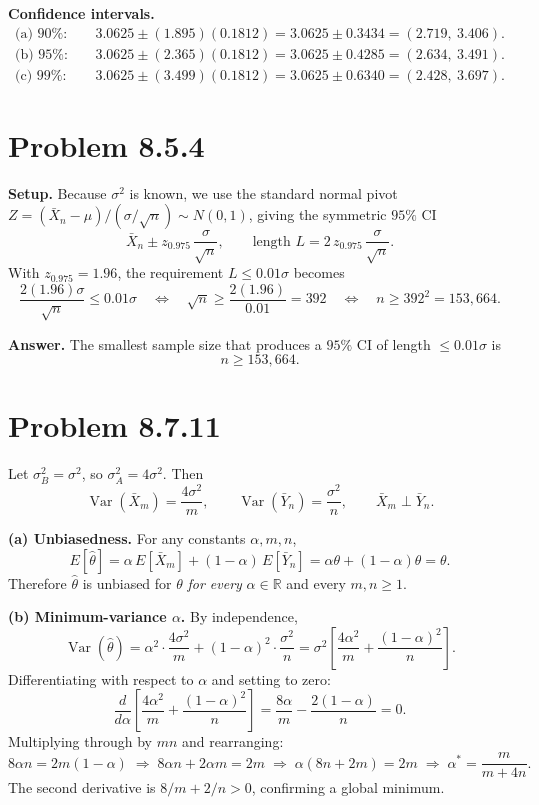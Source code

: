 \documentclass[11pt]{article}
\begin{document}
\textbf{Confidence intervals.}
\begin{align*}
\text{(a) } 90\%: \quad & 3.0625 \pm (1.895)(0.1812) = 3.0625 \pm 0.3434 = \boxed{(2.719,\ 3.406)}. \\[4pt]
\text{(b) } 95\%: \quad & 3.0625 \pm (2.365)(0.1812) = 3.0625 \pm 0.4285 = \boxed{(2.634,\ 3.491)}. \\[4pt]
\text{(c) } 99\%: \quad & 3.0625 \pm (3.499)(0.1812) = 3.0625 \pm 0.6340 = \boxed{(2.428,\ 3.697)}.
\end{align*}

\section*{Problem 8.5.4}

\textbf{Setup.} Because $\sigma^2$ is known, we use the standard normal pivot $Z = (\bar{X}_n - \mu)/(\sigma/\sqrt{n}) \sim N(0,1)$, giving the symmetric $95\%$ CI
\[
\bar{X}_n \pm z_{0.975}\,\frac{\sigma}{\sqrt{n}},
\qquad
\text{length } L = 2\,z_{0.975}\,\frac{\sigma}{\sqrt{n}}.
\]
With $z_{0.975} = 1.96$, the requirement $L \le 0.01\sigma$ becomes
\[
\frac{2(1.96)\sigma}{\sqrt{n}} \le 0.01\sigma
\quad\Longleftrightarrow\quad
\sqrt{n} \ge \frac{2(1.96)}{0.01} = 392
\quad\Longleftrightarrow\quad
n \ge 392^2 = 153{,}664.
\]

\textbf{Answer.} The smallest sample size that produces a $95\%$ CI of length $\le 0.01\sigma$ is
\[
\boxed{n \ge 153{,}664.}
\]

\section*{Problem 8.7.11}

Let $\sigma_B^2 = \sigma^2$, so $\sigma_A^2 = 4\sigma^2$. Then
\[
\operatorname{Var}(\bar{X}_m) = \frac{4\sigma^2}{m},
\qquad
\operatorname{Var}(\bar{Y}_n) = \frac{\sigma^2}{n},
\qquad
\bar{X}_m \perp \bar{Y}_n.
\]

\textbf{(a) Unbiasedness.} For any constants $\alpha, m, n$,
\[
E[\hat{\theta}] = \alpha\,E[\bar{X}_m] + (1-\alpha)\,E[\bar{Y}_n]
= \alpha\theta + (1-\alpha)\theta = \theta.
\]
Therefore $\hat{\theta}$ is unbiased for $\theta$ \emph{for every} $\alpha \in \mathbb{R}$ and every $m, n \ge 1$.

\textbf{(b) Minimum-variance $\alpha$.} By independence,
\[
\operatorname{Var}(\hat{\theta})
= \alpha^2 \cdot \frac{4\sigma^2}{m} + (1-\alpha)^2 \cdot \frac{\sigma^2}{n}
= \sigma^2 \left[\frac{4\alpha^2}{m} + \frac{(1-\alpha)^2}{n}\right].
\]
Differentiating with respect to $\alpha$ and setting to zero:
\[
\frac{d}{d\alpha}\left[\frac{4\alpha^2}{m} + \frac{(1-\alpha)^2}{n}\right]
= \frac{8\alpha}{m} - \frac{2(1-\alpha)}{n} = 0.
\]
Multiplying through by $mn$ and rearranging:
\[
8\alpha n = 2m(1-\alpha)
\;\Longrightarrow\;
8\alpha n + 2\alpha m = 2m
\;\Longrightarrow\;
\alpha(8n + 2m) = 2m
\;\Longrightarrow\;
\boxed{\alpha^* = \frac{m}{m + 4n}.}
\]
The second derivative is $8/m + 2/n > 0$, confirming a global minimum.
\end{document}
